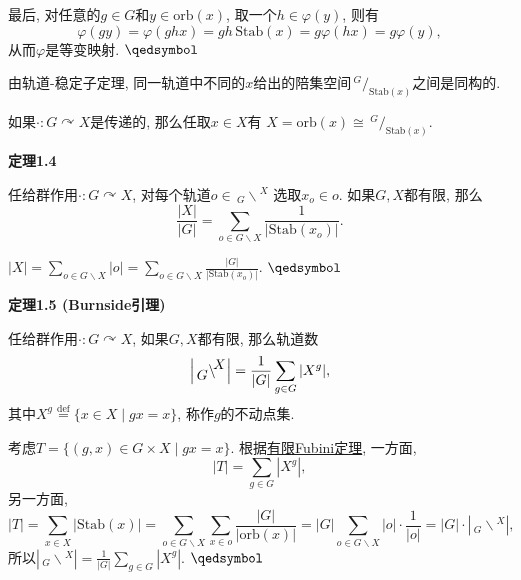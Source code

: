 \documentclass[UTF8]{ctexart}
\begin{document}
最后, 对任意的$g\in G$和$y\in\mathrm{orb}(x)$, 取一个$h\in\varphi(y)$, 则有
\[
    \varphi(gy)=\varphi(ghx)=gh\,\mathrm{Stab}(x)=g\varphi(hx)=g\varphi(y),
\]
从而$\varphi$是等变映射. \hfill $\qedsymbol$

\vspace{15pt}

由轨道-稳定子定理, 同一轨道中不同的$x$给出的陪集空间$\,\!^{\displaystyle G}\!
/_{\displaystyle\mathrm{Stab}(x)}$之间是同构的.

\vspace{3pt}
如果$\cdot:G\curvearrowright X$是传递的, 那么任取$x\in X$有
$X=\mathrm{orb}(x)\cong\,\!^{\displaystyle G}\!/_{\displaystyle\mathrm{Stab}(x)}$.

\vspace{15pt}

\hypertarget{sec:定理1.4}{}
\noindent\textbf{定理1.4}

任给群作用$\cdot:G\curvearrowright X$,
对每个轨道$o\in\,_{\displaystyle G}\backslash\!^{\displaystyle X}$
选取$x_o\in o$. 如果$G,X$都有限, 那么
\vspace{5pt}
\[
    \frac{|X|}{|G|}=\sum_{o\in G\backslash X}\frac{1}{|\mathrm{Stab}(x_o)|}.
\]


$\displaystyle|X|=\sum_{o\in G\backslash X}|o|=
\sum_{o\in G\backslash X}\frac{|G|}{|\mathrm{Stab}(x_o)|}$. \hfill $\qedsymbol$

\vspace{15pt}

\hypertarget{sec:定理1.5}{}
\noindent\textbf{定理1.5 (Burnside引理)}

任给群作用$\cdot:G\curvearrowright X$, 如果$G,X$都有限, 那么轨道数
\vspace{3pt}
\[
    \left|\,_{\displaystyle G}\backslash\!^{\displaystyle X}\right|=
    \frac{1}{|G|}\sum_{g\in G}|X^g|,\\[-3pt]
\]
其中$X^g\overset{\mathrm{def}}{=}\{x\in X\mid gx=x\}$, 称作$g$的不动点集.


考虑$T=\{(g,x)\in G\times X\mid gx=x\}$.
根据\href{../../../01 基础集合论/03 自然数/04 有限求和/03 有限 Fubini 定理#nameddest=sec:定理1.1}
{有限Fubini定理}, 一方面,
\[
    |T|=\sum_{g\in G}|X^g|,
\]
另一方面,
\[
    |T|=\sum_{x\in X}|\mathrm{Stab}(x)|=
    \sum_{o\in G\backslash X}\sum_{x\in o}\frac{|G|}{|\mathrm{orb}(x)|}=
    |G|\sum_{o\in G\backslash X}|o|\cdot\frac{1}{|o|}=
    |G|\cdot\left|\,_{\displaystyle G}\backslash\!^{\displaystyle X}\right|,
\]
所以$\displaystyle\left|\,_{\displaystyle G}\backslash\!^{\displaystyle X}\right|=
\frac{1}{|G|}\sum_{g\in G}|X^g|$. \hfill $\qedsymbol$
\end{document}
